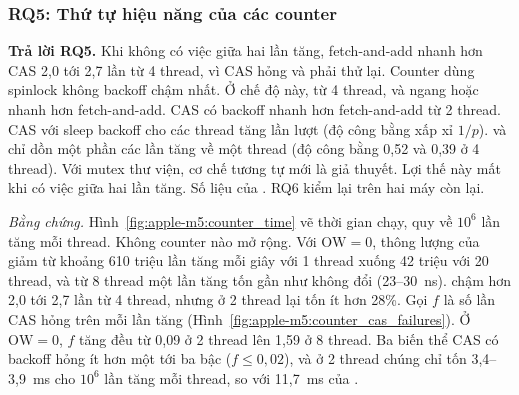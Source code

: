 \subsubsection{RQ5: Thứ tự hiệu năng của các counter}

\begin{rqanswer}\textbf{Trả lời RQ5.} Khi không có việc giữa hai lần tăng, fetch-and-add nhanh hơn CAS
2,0 tới 2,7 lần từ 4 thread, vì CAS hỏng và phải thử lại. Counter dùng spinlock không backoff chậm
nhất. Ở chế độ này, từ 4 thread,  và  ngang hoặc nhanh hơn
fetch-and-add. CAS có backoff nhanh hơn fetch-and-add từ 2 thread. CAS với sleep backoff cho các thread
tăng lần lượt (độ công bằng xấp xỉ $1/p$).  và  chỉ dồn một phần các
lần tăng về một thread (độ công bằng 0,52 và 0,39 ở 4 thread). Với mutex thư viện, cơ chế tương tự mới là
giả thuyết. Lợi thế này mất khi có việc giữa hai lần tăng. Số liệu của . RQ6 kiểm lại
trên hai máy còn lại.\end{rqanswer}


\emph{Bằng chứng.} Hình~\ref{fig:apple-m5:counter_time} vẽ thời gian chạy, quy về $10^6$ lần tăng mỗi
thread. Không counter nào mở rộng. Với $\mathrm{OW} = 0$, thông lượng của  giảm từ khoảng 610
triệu lần tăng mỗi giây với 1 thread xuống 42 triệu với 20 thread, và từ 8 thread một lần tăng tốn gần
như không đổi (23--30~ns).  chậm hơn  2,0 tới 2,7 lần từ 4 thread, nhưng ở 2
thread lại tốn ít hơn 28\%. Gọi $f$ là số lần CAS hỏng trên mỗi lần tăng
(Hình~\ref{fig:apple-m5:counter_cas_failures}). Ở $\mathrm{OW} = 0$, $f$ tăng đều từ 0,09 ở 2 thread lên
1,59 ở 8 thread. Ba biến thể CAS có backoff hỏng ít hơn  một tới ba bậc ($f \le 0{,}02$), và ở
2 thread chúng chỉ tốn 3,4--3,9~ms cho $10^6$ lần tăng mỗi thread, so với 11,7~ms của .

